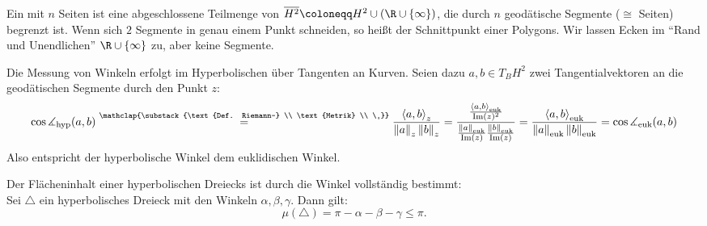 \begin{definition}
  Ein  mit \( n \) Seiten ist eine abgeschlossene Teilmenge von \( \overline{H^2} \coloneqq H^2 \cup \left( \R \cup \left \{ \infty \right \} \right) \), die durch \( n \) geodätische Segmente (\( \cong \) Seiten) begrenzt ist. Wenn sich \( 2 \) Segmente in genau einem Punkt schneiden, so heißt der Schnittpunkt  einer Polygons. Wir lassen Ecken im ``Rand und Unendlichen'' \( \R \cup \left \{ \infty \right \} \) zu, aber keine Segmente.
\end{definition}



\begin{remark}
  Die Messung von Winkeln erfolgt im Hyperbolischen über Tangenten an Kurven. Seien dazu \( a, b \in T_B H^2 \) zwei Tangentialvektoren an die geodätischen Segmente durch den Punkt \( z \):
  \begin{equation*}
    \cos \measuredangle_\text{hyp}(a,b) \overset{\mathclap{\substack{\text{Def. Riemann-} \\ \text{Metrik} \\ \ }}}{=} \frac{\left\langle a,b \right\rangle_z}{\left\Vert a \right\Vert_z \left\Vert b \right\Vert_z} = \frac{\frac{\left\langle a,b \right\rangle_\text{euk}}{\text{Im}(z)^2}}{\frac{\left\Vert a \right\Vert_{\text{euk}}}{\text{Im}(z)} \frac{\left\Vert b \right\Vert_{\text{euk}}}{\text{Im}(z)}} = \frac{\left\langle a,b \right\rangle_\text{euk}}{\left\Vert a \right\Vert_\text{euk} \left\Vert b \right\Vert_\text{euk}} = \cos \measuredangle_\text{euk}(a,b)
  \end{equation*}
  Also entspricht der hyperbolische Winkel dem euklidischen Winkel.
\end{remark}

\begin{theorem}
  Der Flächeninhalt einer hyperbolischen Dreiecks ist durch die Winkel vollständig bestimmt: \\
  Sei \( \triangle \) ein hyperbolisches Dreieck mit den Winkeln \( \alpha, \beta, \gamma \). Dann gilt:
  \begin{equation*}
    \mu(\triangle) = \pi - \alpha - \beta - \gamma \leq \pi\text{.}
  \end{equation*}
\end{theorem}

